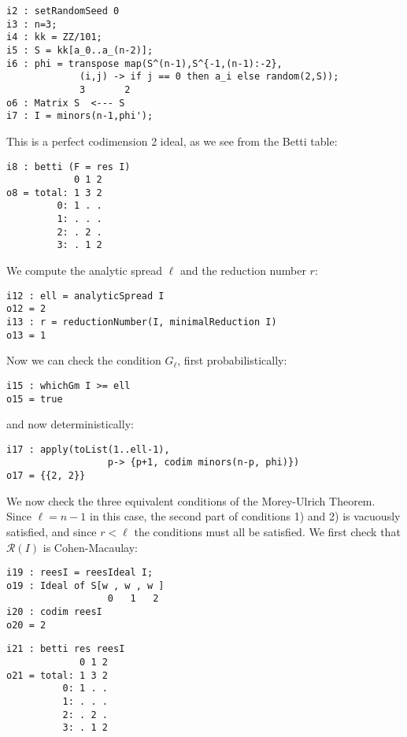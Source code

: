 \documentclass[twoside,12pt, leqno]{amsart}
\def\RR{{\mathcal R}}
\begin{document}
\begin{footnotesize}
 \begin{verbatim}
i2 : setRandomSeed 0
i3 : n=3;
i4 : kk = ZZ/101;
i5 : S = kk[a_0..a_(n-2)];
i6 : phi = transpose map(S^(n-1),S^{-1,(n-1):-2},
             (i,j) -> if j == 0 then a_i else random(2,S));
             3       2
o6 : Matrix S  <--- S
i7 : I = minors(n-1,phi');
\end{verbatim}
\end{footnotesize}
This is a perfect codimension 2 ideal, as we see from the Betti table:
\begin{footnotesize}
 \begin{verbatim}
i8 : betti (F = res I)
            0 1 2
o8 = total: 1 3 2
         0: 1 . .
         1: . . .
         2: . 2 .
         3: . 1 2
\end{verbatim}
 \end{footnotesize}
We  compute the analytic spread $\ell$ and the reduction number $r$:
\begin{footnotesize}
 \begin{verbatim}
i12 : ell = analyticSpread I
o12 = 2
i13 : r = reductionNumber(I, minimalReduction I)
o13 = 1
\end{verbatim}
\end{footnotesize}
Now we can check the condition $G_{\ell}$, first probabilistically:
\begin{footnotesize}
 \begin{verbatim}
i15 : whichGm I >= ell
o15 = true
\end{verbatim}
\end{footnotesize}
and now deterministically:
\begin{footnotesize}
 \begin{verbatim}
i17 : apply(toList(1..ell-1), 
                  p-> {p+1, codim minors(n-p, phi)})
o17 = {{2, 2}}
\end{verbatim}
\end{footnotesize}
We now check the three equivalent conditions of the Morey-Ulrich Theorem.
           Since $\ell = n-1$ in this case, the second part of conditions
           1) and 2) is vacuously satisfied, and since $r<\ell$
           the conditions must all be satisfied.
           We first check that $\RR(I)$ is Cohen-Macaulay:
\begin{footnotesize}
 \begin{verbatim}
i19 : reesI = reesIdeal I;
o19 : Ideal of S[w , w , w ]
                  0   1   2
i20 : codim reesI
o20 = 2
\end{verbatim}
 \goodbreak
\begin{verbatim}
i21 : betti res reesI
             0 1 2
o21 = total: 1 3 2
          0: 1 . .
          1: . . .
          2: . 2 .
          3: . 1 2
\end{verbatim}
\end{footnotesize}
\end{document}
